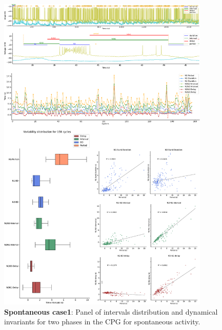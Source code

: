 \begin{figure}[htbp]
	\centering
	\includegraphics[width=0.9\textwidth]{./invariants/data/SUSSEX/prep1/images/2phases/panel_with_intervals.pdf}
	\caption{\textbf{Spontaneous case1}: Panel of intervals distribution and dynamical invariants for two phases in the CPG for spontaneous activity.}
	\label{fig:prep1 2 phases invariants}
\end{figure}
%
